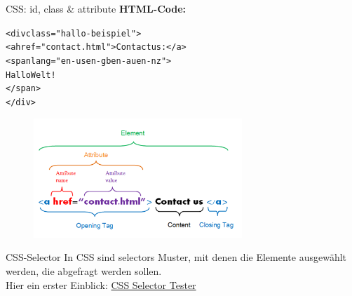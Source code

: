 \documentclass[xcolor=dvipsnames]{beamer}\usepackage[]{graphicx}\usepackage[]{color}
\makeatletter
\newcommand{\hlstr}[1]{\textcolor[rgb]{0.192,0.494,0.8}{#1}}%
\newenvironment{kframe}{%
 \def\at@end@of@kframe{}%
 \ifinner\ifhmode%
  \def\at@end@of@kframe{\end{minipage}}%
  \begin{minipage}{\columnwidth}%
 \fi\fi%
 \def\FrameCommand##1{\hskip\@totalleftmargin \hskip-\fboxsep
 \colorbox{shadecolor}{##1}\hskip-\fboxsep
     \hskip-\linewidth \hskip-\@totalleftmargin \hskip\columnwidth}%
 \MakeFramed {\advance\hsize-\width
   \@totalleftmargin\z@ \linewidth\hsize
   \@setminipage}}%
 {\par\unskip\endMakeFramed%
 \at@end@of@kframe}
\makeatother
\begin{document}
\begin{frame}[fragile]{CSS: id, class \& attribute}
\textbf{HTML-Code:}
\begin{kframe}
\begin{alltt}
<div class=\hlstr{"hallo-beispiel"}>
    <a href=\hlstr{"contact.html"}>Contact us:</a>
    <span lang=\hlstr{"en-us en-gb en-au en-nz"}>
      Hallo Welt!
    </span>
</div>
\end{alltt}
\end{kframe}
  \begin{figure}
  	\centering
  	\includegraphics[width=0.7\textwidth]{figure/CSSStructure.png}
  \end{figure}
\end{frame}



\begin{frame}{CSS-Selector}
In CSS sind selectors Muster, mit denen die Elemente ausgewählt werden, die abgefragt werden sollen.\\
Hier ein erster Einblick: \href{https://www.w3schools.com/cssref/trysel.asp}{CSS Selector Tester}
\end{frame}
\end{document}
